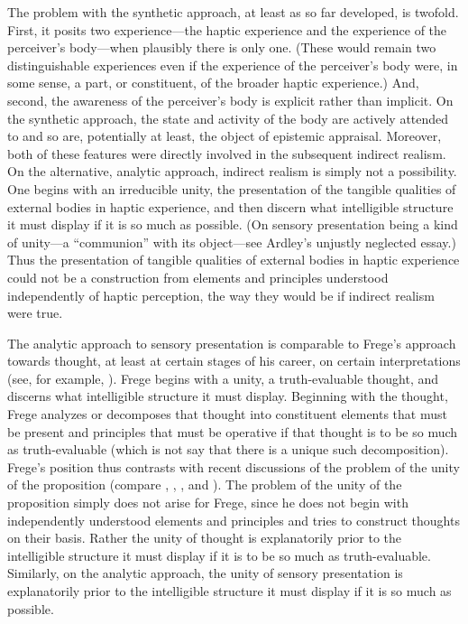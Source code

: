 The problem with the synthetic approach, at least as so far developed, is twofold. First, it posits two experience---the haptic experience and the experience of the perceiver's body---when plausibly there is only one. (These would remain two distinguishable experiences even if the experience of the perceiver's body were, in some sense, a part, or constituent, of the broader haptic experience.) And, second, the awareness of the perceiver's body is explicit rather than implicit. On the synthetic approach, the state and activity of the body are actively attended to and so are, potentially at least, the object of epistemic appraisal. Moreover, both of these features were directly involved in the subsequent indirect realism. On the alternative, analytic approach, indirect realism is simply not a possibility. One begins with an irreducible unity, the presentation of the tangible qualities of external bodies in haptic experience, and then discern what intelligible structure it must display if it is so much as possible. (On sensory presentation being a kind of unity---a ``communion'' with its object---see Ardley's \citeyear{Ardley:1958aa} unjustly neglected essay.) Thus the presentation of tangible qualities of external bodies in haptic experience could not be a construction from elements and principles understood independently of haptic perception, the way they would be if indirect realism were true.

The analytic approach to sensory presentation is comparable to Frege's approach towards thought, at least at certain stages of his career, on certain interpretations (see, for example, \citealt[essays 7 and 9]{Travis:2011qd}). Frege begins with a unity, a truth-evaluable thought, and discerns what intelligible structure it must display. Beginning with the thought, Frege analyzes or decomposes that thought into constituent elements that must be present and principles that must be operative if that thought is to be so much as truth-evaluable (which is not say that there is a unique such decomposition). Frege's position thus contrasts with recent discussions of the problem of the unity of the proposition (compare \citealt{King:2007ad}, \citealt{Gaskin:2008aa}, \citealt{Soames:2010qq}, and \citealt{King:2014ls}). The problem of the unity of the proposition simply does not arise for Frege, since he does not begin with independently understood elements and principles and tries to construct thoughts on their basis. Rather the unity of thought is explanatorily prior to the intelligible structure it must display if it is to be so much as truth-evaluable. Similarly, on the analytic approach, the unity of sensory presentation is explanatorily prior to the intelligible structure it must display if it is so much as possible.

